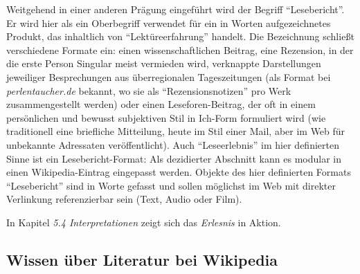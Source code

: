 \documentclass[fontsize=12pt]{scrartcl}
\begin{document}
Weitgehend in einer anderen Pr\"agung eingef\"uhrt wird der Begriff "`Lesebericht"'. Er wird \mbox{hier} als ein Oberbegriff verwendet f\"ur ein in Worten aufge\-zeichnetes Produkt, das inhaltlich von "`Lekt\"ureerfah\-rung"' handelt. Die Be\-zeichnung schlie{\ss}t verschiedene Formate ein: einen wissenschaftlichen Beitrag, eine Rezension, in der die erste Person Singular meist vermieden wird, verknappte Darstellungen jeweiliger Besprechungen aus \"uberregionalen Tageszeitungen (als Format bei \textit{per\-len\-tau\-cher.de} bekannt, wo sie als "`Rezensionsnotizen"' pro Werk zusammengestellt werden) oder einen Leseforen-Beitrag, der oft in einem pers\"onlichen und bewusst subjektiven Stil in Ich-Form formuliert wird (wie traditionell eine briefliche Mitteilung, heute im Stil einer Mail, aber im Web f\"ur unbekannte Adressaten\textsuperscript{\tiny *} ver\"of\-fent\-licht). Auch "`Leseerlebnis"' im \mbox{hier} definierten Sinne ist ein Lesebericht-Format: Als dezidierter Abschnitt kann es modular in einen Wi\-ki\-pe\-dia-Eintrag eingepasst werden. Objekte des \mbox{hier} definierten Formats "`Lesebericht"' sind in Worte gefasst und sollen m\"oglichst im Web mit direkter Verlinkung referenzierbar sein (Text, Audio oder Film). 

In Kapitel \textit{5.4 Interpretationen} zeigt sich das \textit{Erlesnis} in Aktion.

\pagebreak

\subsection{Wissen \"uber Literatur bei Wikipedia}
\label{subsec:5.2}
\end{document}
